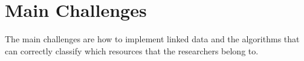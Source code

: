 \section{Main Challenges}
\label{sec:challenges}
The main challenges are how to implement linked data and the algorithms that can correctly classify which resources that the researchers belong to. 

